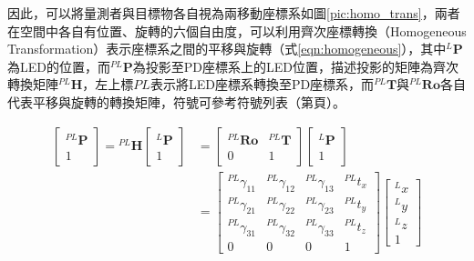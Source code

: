     因此，可以將量測者與目標物各自視為兩移動座標系如圖\ref{pic:homo_trans}，兩者在空間中各自有位置、旋轉的六個自由度，可以利用齊次座標轉換（Homogeneous Transformation）表示座標系之間的平移與旋轉（式\ref{eqn:homogeneous}），其中$^{L}\boldsymbol{P}$為LED的位置，而$^{PL}\boldsymbol{P}$為投影至PD座標系上的LED位置，描述投影的矩陣為齊次轉換矩陣$^{PL}\boldsymbol{H}$，左上標$PL$表示將LED座標系轉換至PD座標系，而$^{PL}\boldsymbol{T}$與$^{PL}\boldsymbol{Ro}$各自代表平移與旋轉的轉換矩陣，符號可參考符號列表（第\pageref{chp:symbol}頁）。
    
  

    \begin{equation}
        \label{eqn:homogeneous}
        \begin{aligned}
        {\left[\begin{array}{c}
        { }^{P L} \boldsymbol{P} \\
        1
        \end{array}\right]={ }^{P L} \boldsymbol{H}\left[\begin{array}{c}
        { }^{L} \boldsymbol{P} \\
        1
        \end{array}\right] } &=\left[\begin{array}{cc}
        { }^{P L} \boldsymbol{R} \boldsymbol{o} & { }^{P L} \boldsymbol{T} \\
        0 & 1
        \end{array}\right]\left[\begin{array}{c}
        { }^{L} \boldsymbol{P} \\
        1
        \end{array}\right] \\
        &=\left[\begin{array}{cccc}
        { }^{P L} \gamma_{11} & { }^{P L} \gamma_{12} & { }^{P L} \gamma_{13} & { }^{P L} {t}_{x} \\
        { }^{P L} \gamma_{21} & ^{P L } \gamma_{22} & { }^{P L} \gamma_{23} & { }^{P L} {t}_{y} \\
        { }^{P L} \gamma_{31} & ^{P L} \gamma_{32} & { }^{P L} \gamma_{33} & { }^{P L} {t}_{z} \\
        0 & 0 & 0 & 1
        \end{array}\right]\left[\begin{array}{c}
        { }^{L} {x} \\
        { }^{L} {y} \\
        { }^{L} z \\
        1
        \end{array}\right]
        \end{aligned}
    \end{equation}


